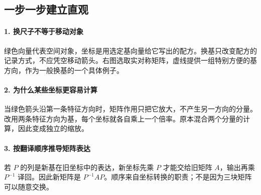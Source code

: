 \subsection*{一步一步建立直观}

\paragraph{1. 换尺子不等于移动对象}

绿色向量代表空间对象，坐标是用选定基向量给它写出的配方。换基只改变配方的记录方式，不应凭空移动箭头。右图选取实对称矩阵，虚线提供一组特别方便的基方向，作为一般换基的一个具体例子。



\paragraph{2. 为什么某些坐标更容易计算}

当绿色箭头沿第一条特征方向时，矩阵作用只把它放大，不产生另一方向的分量。改用两条特征方向为基，每个坐标就各自乘上一个倍率。原本混合两个分量的计算，因此变成独立的缩放。



\paragraph{3. 按翻译顺序推导矩阵表达}

若 $P$ 的列是新基在旧坐标中的表达，新坐标先乘 $P$ 才能交给旧矩阵 $A$，输出再乘 $P^{-1}$ 译回。因此新矩阵是 $P^{-1}AP$。顺序来自坐标转换的职责；不是因为三块矩阵可以随意交换。
